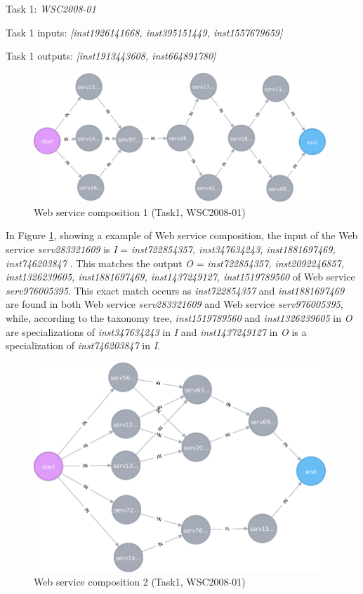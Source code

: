 Task 1: \emph{WSC2008-01}\par
Task 1 inputs: \emph{[inst1926141668, inst395151449, inst1557679659]}\par
Task 1 outputs: \emph{[inst1913443608, inst664891780]}\\\par

\begin{figure}[h]
\includegraphics[width=11cm]{svg-chapter4-c1.pdf}
\centering
\caption{Web service composition 1 (Task1, WSC2008-01)}
\label{fig:c4compEg1} 
\end{figure} 
\begin{exmp}
In Figure \ref{fig:c4compEg1}, showing a example of Web service composition, the input of the Web service \emph{serv283321609} is \emph{I} = \emph{{ inst722854357, inst347634243, inst1881697469, inst746203847 }}. This matches the output  \emph{O} = \emph{{inst722854357, inst2092246857, inst1326239605, inst1881697469, inst1437249127, inst1519789560 }} of Web service  \emph{serv976005395}. This exact match occurs as \emph{inst722854357} and \emph{inst1881697469} are found in both Web service \emph{serv283321609} and Web service \emph{serv976005395}, while,  according to the taxonomy tree, \emph{inst1519789560} and \emph{inst1326239605} in \emph{O} are specializations of \emph{inst347634243} in \emph{I} and \emph{inst1437249127} in \emph{O} is a specialization of \emph{inst746203847} in \emph{I}.\par
\end{exmp}

\begin{figure}[h]
\includegraphics[width=11cm]{svg-chapter4-c2.pdf}
\centering
\caption{Web service composition 2 (Task1, WSC2008-01)}
\label{fig:c4compEg2} 
\end{figure} 

